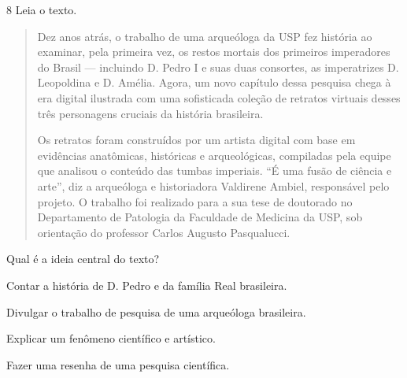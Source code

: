 \num{8} Leia o texto.

\begin{quote}
\noindent Dez anos atrás, o trabalho de uma arqueóloga da USP fez história ao
examinar, pela primeira vez, os restos mortais dos primeiros imperadores
do Brasil — incluindo D. Pedro I e suas duas consortes, as
imperatrizes D. Leopoldina e D. Amélia. Agora, um novo capítulo dessa
pesquisa chega à era digital ilustrada com uma sofisticada coleção de
retratos virtuais desses três personagens cruciais da história
brasileira.

Os retratos foram construídos por um artista digital com base em
evidências anatômicas, históricas e arqueológicas, compiladas pela
equipe que analisou o conteúdo das tumbas imperiais. ``É uma fusão de
ciência e arte'', diz a arqueóloga e historiadora Valdirene Ambiel,
responsável pelo projeto. O trabalho foi realizado para a sua tese de
doutorado no Departamento de Patologia da Faculdade de Medicina da USP,
sob orientação do professor Carlos Augusto Pasqualucci.

\end{quote}

\noindent Qual é a ideia central do texto?

\begin{escolha}
\item Contar a história de D. Pedro e da família Real brasileira.
\item Divulgar o trabalho de pesquisa de uma arqueóloga brasileira.
\item Explicar um fenômeno científico e artístico.
\item Fazer uma resenha de uma pesquisa científica.
\end{escolha}



